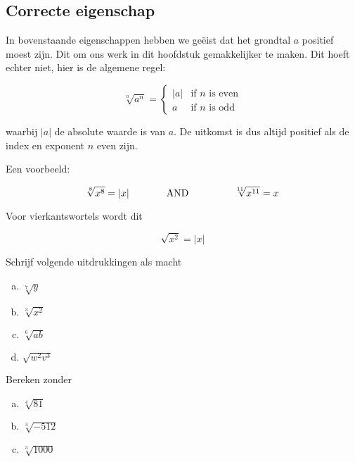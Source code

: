 \documentclass[12pt,twoside]{article}
\begin{document}
\subsection{Correcte eigenschap }

In bovenstaande eigenschappen hebben we geëist dat het grondtal $a$ positief moest zijn. Dit om ons werk in dit hoofdstuk gemakkelijker te maken. Dit hoeft echter niet, hier is de algemene regel:

\[\sqrt[n]{{{a^n}}} = \left\{ {\begin{array}{*{20}{l}}{\left| a \right|}&{{\mbox{if }}n{\mbox{ is
even}}}\\a&{{\mbox{if }}n{\mbox{ is odd}}}\end{array}} \right.\]

waarbij \(\left| a \right|\) de absolute waarde is van $a$. De uitkomst is dus altijd positief als de index en exponent $n$ even zijn.

Een voorbeeld:

\[\sqrt[8]{{{x^8}}} = \left| x
\right|\hspace{0.25in}\hspace{0.25in}{\mbox{AND}}\hspace{0.25in}\hspace{0.25in}\,\,\,\,\,\,\sqrt[{11}]{{{x^
{11}}}} = x\]

Voor vierkantswortels wordt dit

\[\sqrt {{x^2}} = \left| x \right|\]

\begin{oefening}
  Schrijf volgende uitdrukkingen als macht
  \begin{enumerate}[(a)]
    \itemsep1em
  \item \(\sqrt[7]{y}\)
  \item \(\sqrt[3]{{{x^2}}}\)
  \item \(\sqrt[6]{{ab}}\)
  \item \(\sqrt {{w^2}{v^3}} \)
  \end{enumerate}
\end{oefening}

\begin{oefening}
  Bereken zonder 
  \begin{enumerate}[(a)]
    \itemsep1em
  \item  \(\sqrt[4]{{81}}\)
  \item \(\sqrt[3]{{ - 512}}\)
  \item \(\sqrt[3]{{1000}}\)
  \end{enumerate}
\end{oefening}
\end{document}
